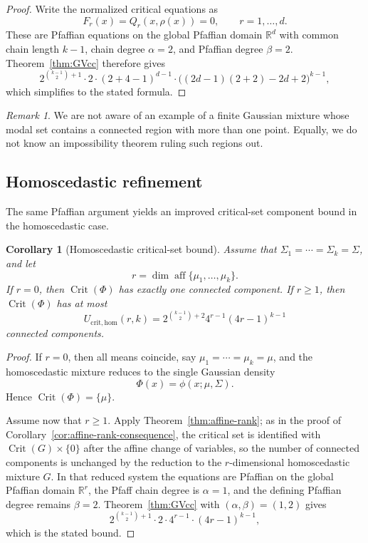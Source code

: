 \documentclass[11pt]{article}
\theoremstyle{plain}
\newtheorem{corollary}[theorem]{Corollary}
\theoremstyle{definition}
\theoremstyle{remark}
\newtheorem{remark}[theorem]{Remark}
\numberwithin{equation}{section}
\DeclareMathOperator{\aff}{aff}
\DeclareMathOperator{\Crit}{Crit}
\newcommand{\R}{\mathbb{R}}
\begin{document}
\begin{proof}
Write the normalized critical equations as
\[
F_r(x)=Q_r(x,\rho(x))=0,\qquad r=1,\dots,d.
\]
These are Pfaffian equations on the global Pfaffian domain $\R^d$ with common chain length $k-1$, chain degree $\alpha=2$, and Pfaffian degree $\beta=2$. Theorem~\ref{thm:GVcc} therefore gives
\[
2^{\binom{k-1}{2}+1}\cdot 2\cdot (2+4-1)^{d-1}\cdot \bigl((2d-1)(2+2)-2d+2\bigr)^{k-1},
\]
which simplifies to the stated formula.
\end{proof}


\begin{remark}\label{rem:no-example}
We are not aware of an example of a finite Gaussian mixture whose modal set contains a connected region with more than one point. Equally, we do not know an impossibility theorem ruling such regions out.
\end{remark}

\subsection{Homoscedastic refinement}\label{subsec:crit-hom}

The same Pfaffian argument yields an improved critical-set component bound in the homoscedastic case.

\begin{corollary}[Homoscedastic critical-set bound]\label{cor:crit-hom}
Assume that $\Sigma_1=\cdots=\Sigma_k=\Sigma$, and let
\[
r=\dim \aff\{\mu_1,\dots,\mu_k\}.
\]
If $r=0$, then $\Crit(\Phi)$ has exactly one connected component. If $r\ge 1$, then $\Crit(\Phi)$ has at most
\[
U_{\mathrm{crit,hom}}(r,k)=2^{\binom{k-1}{2}+2}4^{r-1}(4r-1)^{k-1}
\]
connected components.
\end{corollary}

\begin{proof}
If $r=0$, then all means coincide, say $\mu_1=\cdots=\mu_k=\mu$, and the homoscedastic mixture reduces to the single Gaussian density
\[
\Phi(x)=\phi(x;\mu,\Sigma).
\]
Hence $\Crit(\Phi)=\{\mu\}$.

Assume now that $r\ge 1$. Apply Theorem~\ref{thm:affine-rank}; as in the proof of Corollary~\ref{cor:affine-rank-consequence}, the critical set is identified with $\Crit(G)\times\{0\}$ after the affine change of variables, so the number of connected components is unchanged by the reduction to the $r$-dimensional homoscedastic mixture $G$. In that reduced system the equations are Pfaffian on the global Pfaffian domain $\R^r$, the Pfaff chain degree is $\alpha=1$, and the defining Pfaffian degree remains $\beta=2$. Theorem~\ref{thm:GVcc} with $(\alpha,\beta)=(1,2)$ gives
\[
2^{\binom{k-1}{2}+1}\cdot 2\cdot 4^{r-1}\cdot (4r-1)^{k-1},
\]
which is the stated bound.
\end{proof}
\end{document}
